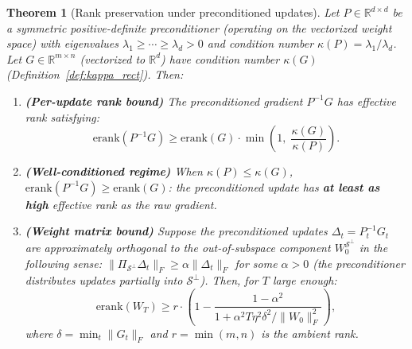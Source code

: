 \documentclass{article}
\newtheorem{theorem}{Theorem}
\newcommand{\erank}{\mathrm{erank}}
\newcommand{\RR}{\mathbb{R}}
\newcommand{\cS}{\mathcal{S}}
\begin{document}
\begin{theorem}[Rank preservation under preconditioned updates]
\label{thm:rank_preservation}
Let $P \in \RR^{d\times d}$ be a symmetric positive-definite preconditioner (operating on the vectorized weight space) with eigenvalues $\lambda_1 \geq \cdots \geq \lambda_d > 0$ and condition number $\kappa(P) = \lambda_1/\lambda_d$. Let $G \in \RR^{m\times n}$ (vectorized to $\mathbb{R}^d$) have condition number $\kappa(G)$ (Definition~\ref{def:kappa_rect}). Then:

\begin{enumerate}[nosep]
    \item \textbf{(Per-update rank bound)} The preconditioned gradient $P^{-1}G$ has effective rank satisfying:
    \begin{equation}
    \label{eq:per_update_bound}
    \erank(P^{-1}G) \geq \erank(G) \cdot \min\!\left(1, \; \frac{\kappa(G)}{\kappa(P)}\right).
    \end{equation}
    \item \textbf{(Well-conditioned regime)} When $\kappa(P) \leq \kappa(G)$, $\erank(P^{-1}G) \geq \erank(G)$: the preconditioned update has \textbf{at least as high} effective rank as the raw gradient.
    \item \textbf{(Weight matrix bound)} Suppose the preconditioned updates $\Delta_t = P_t^{-1}G_t$ are approximately orthogonal to the out-of-subspace component $W_0^{\cS^\perp}$ in the following sense: $\|\Pi_{\cS^\perp}\Delta_t\|_F \geq \alpha\|\Delta_t\|_F$ for some $\alpha > 0$ (the preconditioner distributes updates partially into $\cS^\perp$). Then, for $T$ large enough:
    \begin{equation}
    \label{eq:weight_rank_bound}
    \erank(W_T) \geq r \cdot \left(1 - \frac{1-\alpha^2}{1 + \alpha^2 T \eta^2 \delta^2 / \|W_0\|_F^2}\right),
    \end{equation}
    where $\delta = \min_t \|G_t\|_F$ and $r = \min(m,n)$ is the ambient rank.
\end{enumerate}
\end{theorem}
\end{document}
